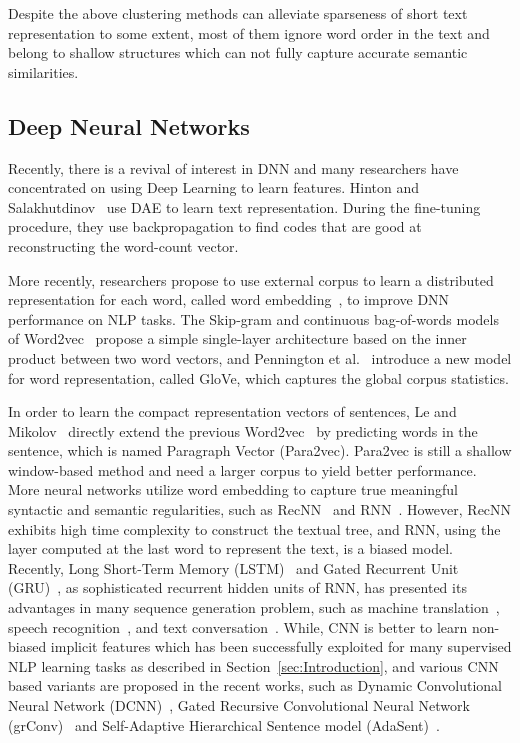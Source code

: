 \documentclass[review]{elsarticle}
\begin{document}
Despite the above clustering methods can alleviate sparseness of short text representation to some extent, most of them ignore word order in the text and belong to shallow structures which can not fully capture accurate semantic similarities.


\subsection{Deep Neural Networks}
Recently, there is a revival of interest in DNN and many researchers have concentrated on using Deep Learning to learn features. Hinton and Salakhutdinov~\cite{23_hinton2006reducing} use DAE to learn text representation. During the fine-tuning procedure, they use backpropagation to find codes that are good at reconstructing the word-count vector.

More recently, researchers propose to use external corpus to learn a distributed representation for each word, called word embedding~\cite{25_turian2010word}, to improve DNN performance on NLP tasks. The Skip-gram and continuous bag-of-words models of Word2vec~\cite{21_mikolov2013distributed} propose a simple single-layer architecture based on the inner product between two word vectors, and Pennington et al.~\cite{26_pennington2014glove} introduce a new model for word representation, called GloVe, which captures the global corpus statistics.

In order to learn the compact representation vectors of sentences, Le and Mikolov~\cite{le2014distributed} directly extend the previous Word2vec~\cite{21_mikolov2013distributed} by predicting words in the sentence, which is named Paragraph Vector (Para2vec). Para2vec is still a shallow window-based method and need a larger corpus to yield better performance. More neural networks utilize word embedding to capture true meaningful syntactic and semantic regularities, such as RecNN~\cite{24_socher2011semi,35_socher2013recursive} and RNN~\cite{38_mikolov2011extensions}. However, RecNN exhibits high time complexity to construct the textual tree, and RNN, using the layer computed at the last word to represent the text, is a biased model. Recently, Long Short-Term Memory (LSTM)~\cite{hochreiter1997long} and Gated Recurrent Unit (GRU)~\cite{cho2014learning}, as sophisticated recurrent hidden units of RNN, has presented its advantages in many sequence generation problem, such as machine translation~\cite{sutskever2014sequence}, speech recognition~\cite{graves2013speech}, and text conversation~\cite{shang2015neural}. While, CNN is better to learn non-biased implicit features which has been successfully exploited for many supervised NLP learning tasks as described in Section~\ref{sec:Introduction}, and various CNN based variants are proposed in the recent works, such as Dynamic Convolutional Neural Network (DCNN)~\cite{16_blunsom2014convolutional}, Gated Recursive Convolutional Neural Network (grConv)~\cite{cho2014properties} and Self-Adaptive Hierarchical Sentence model (AdaSent)~\cite{zhao2015self}.
\end{document}
